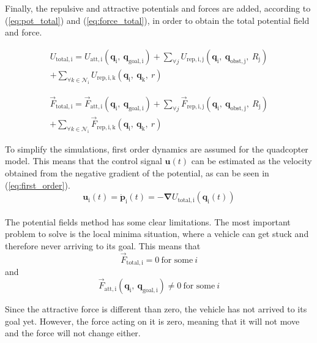 \documentclass[journal]{IEEEtran}
\newcommand*{\subb}[1]{_{\mathrm{#1}}}
\begin{document}
		Finally, the repulsive and attractive potentials and forces are added, according to (\ref{eq:pot_total}) and (\ref{eq:force_total}), in order to obtain the total potential field and force. 
		
		\begin{multline} \label{eq:pot_total}
		U\subb{total, i} = U\subb{att, i}(\bm{q}\subb{i}, \ \bm{q}\subb{goal, i}) + \sum \limits_{\forall j}U\subb{rep,i,j} (\bm{q}\subb{i}, \ \bm{q}\subb{obst, j},\ R\subb{j}) \\ + \sum \limits_{\forall k \in \mathcal{N}\subb{i}}U\subb{rep,i,k}(\bm{q}\subb{i}, \ \bm{q}\subb{k},\ r)
		\end{multline}
		
		\begin{multline} \label{eq:force_total}
		\vec{F}\subb{total, i} = \vec{F}\subb{att,i}(\bm{q}\subb{i}, \ \bm{q}\subb{goal, i}) + \sum\limits_{\forall j} \vec{F}\subb{rep,i,j}(\bm{q}\subb{i}, \ \bm{q}\subb{obst, j},\ R\subb{j}) \\ + \sum\limits_{\forall k \in \mathcal{N}\subb{i}} \vec{F}\subb{rep,i,k}(\bm{q}\subb{i}, \ \bm{q}\subb{k},\ r)
		\end{multline}
		
		
		To simplify the simulations, first order dynamics are assumed for the quadcopter model. This means that the control signal $\bm{u}(t)$ can be estimated as the velocity obtained from the negative gradient of the potential, as can be seen in (\ref{eq:first_order}).
		\begin{equation} \label{eq:first_order}
		\bm{u}\subb{i}(t) = \bm{\dot p}\subb{i}(t) = -\bm{\nabla}U\subb{total, i}(\bm{q}\subb{i}(t))
		\end{equation}
		\\
		The potential fields method has some clear limitations. The most important problem to solve is the local minima situation, where a vehicle can get stuck and therefore never arriving to its goal. This means that 
		\begin{equation} 
			\vec{F}\subb{total, i} = 0 \ \textrm{for some} \ i
		\end{equation}
		and
		\begin{equation} 
			\vec{F}\subb{att,i}(\bm{q}\subb{i}, \ \bm{q}\subb{goal, i}) \neq 0  \ \textrm{for some} \ i
		\end{equation}
		
		Since the attractive force is different than zero, the vehicle has not arrived to its goal yet. However, the force acting on it is zero, meaning that it will not move and the force will not change either. \\
		
\end{document}
